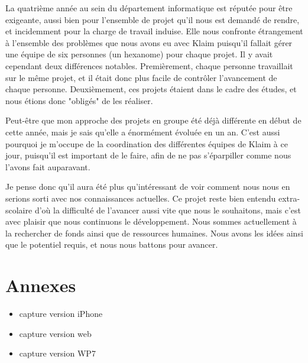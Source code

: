 \documentclass{article}
\begin{document}
		La quatrième année au sein du département informatique est réputée pour être exigeante, aussi bien  pour l'ensemble de projet qu'il nous est demandé de rendre, et incidemment pour la charge de travail induise. Elle nous confronte étrangement à l'ensemble des problèmes que nous avons eu avec Klaim puisqu'il fallait gérer une équipe de six personnes (un hexanome) pour chaque projet. Il y avait cependant deux différences notables. Premièrement, chaque personne travaillait sur le même projet, et il était donc plus facile de contrôler l'avancement de chaque personne. Deuxièmement, ces projets étaient dans le cadre des études, et nous étions donc "obligés" de les réaliser.
		
		Peut-être que mon approche des projets en groupe été déjà différente en début de cette année, mais je sais qu'elle a énormément évoluée en un an. C'est aussi pourquoi je m'occupe de la coordination des différentes équipes de Klaim à ce jour, puisqu'il est important de le faire, afin de ne pas s'éparpiller comme nous l'avons fait auparavant.
		
		Je pense donc qu'il aura été plus qu'intéressant de voir comment nous nous en serions sorti avec nos connaissances actuelles. Ce projet reste bien entendu extra-scolaire d'où la difficulté de l'avancer aussi vite que nous le souhaitons, mais c'est avec plaisir que nous continuons le développement. Nous sommes actuellement à la rechercher de fonds ainsi que de ressources humaines. Nous avons les idées ainsi que le potentiel requis, et nous nous battons pour avancer.
	
\newpage	
\section{Annexes}
	\begin{itemize}
		\item capture version iPhone
		\item capture version web
		\item capture version WP7
	\end{itemize}
\end{document}

